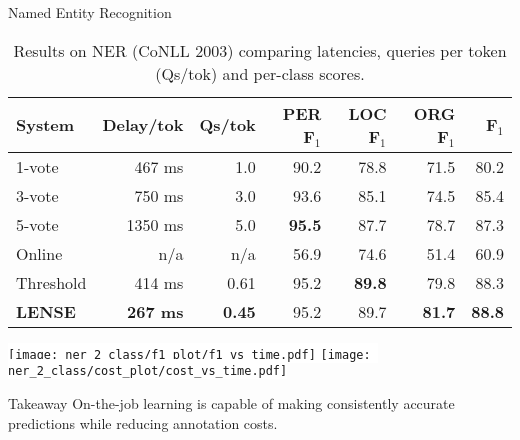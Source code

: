 
\begin{block}{Named Entity Recognition}
\begin{table}[t]
  {\small
\begin{tabular}{l r r r r r r }
      \textbf{System} & \textbf{Delay/tok} & \textbf{Qs/tok} & \textbf{PER F$_1$} & \textbf{LOC F$_1$} & \textbf{ORG F$_1$} & \textbf{F$_1$}
    \\ \hline
    1-vote & 467 ms & 1.0 & 90.2 & 78.8 & 71.5 & 80.2
      \\ %
    3-vote & 750 ms & 3.0 & 93.6 & 85.1 & 74.5 & 85.4
        \\ %
    5-vote & 1350 ms & 5.0 & \textbf{95.5} & 87.7 & 78.7 & 87.3 
        \\ \hline
    Online & n/a & n/a & 56.9 & 74.6 & 51.4 & 60.9
        \\    %
    Threshold & 414 ms & 0.61 & 95.2 & \textbf{89.8} & 79.8 & 88.3
        \\ %
    \textbf{LENSE} & \textbf{267 ms} & \textbf{0.45} & 95.2 & 89.7 & \textbf{81.7} & \textbf{88.8} 
\end{tabular}
}
\caption{Results on NER (CoNLL 2003) comparing latencies, queries per token (Qs/tok)
and per-class \fone{} scores.}
\label{tbl:results}
\end{table}

  \begin{center}
    \colorbox{white}{
    \texttt{[image: ner\_2\_class/f1\_plot/f1\_vs\_time.pdf]}
    }
    \colorbox{white}{
    \texttt{[image: ner\_2\_class/cost\_plot/cost\_vs\_time.pdf]}
    }
  \end{center}

  \begin{exampleblock}{Takeaway}
      On-the-job learning is capable of making consistently accurate predictions while reducing annotation costs.
  \end{exampleblock}
\end{block}
\vfill

